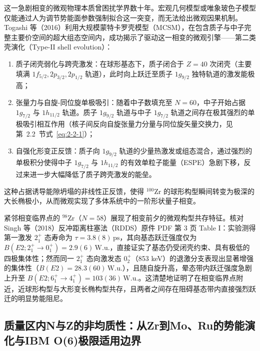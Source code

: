 这一急剧相变的微观物理本质曾困扰学界数十年。宏观几何模型或唯象玻色子模型仅能通过人为调节势能面参数强制拟合这一突变，而无法给出微观因果机制。Togashi 等（2016）\cite{doctoral-r1-g28-togashi-2016-zr-mcsm-qpt}利用大规模蒙特卡罗壳模型（MCSM），在包含质子与中子完整主要价空间的超大组态空间内，成功揭示了驱动这一相变的微观引擎——第二类壳演化（Type-II shell evolution）：
\begin{enumerate}
\item 质子闭壳弱化与跨壳激发：在球形基态下，质子闭合于 $Z=40$ 次闭壳（主要填满 $1f_{5/2}, 2p_{3/2}, 2p_{1/2}$ 轨道），此时向上跃迁至质子 $1g_{9/2}$ 独特轨道的激发能极高；
\item 张量力与自旋-同位旋单极吸引：随着中子数填充至 $N=60$，中子开始占据 $1g_{7/2}$ 与 $1h_{11/2}$ 轨道。质子 $1g_{9/2}$ 轨道与中子 $1g_{7/2}$ 轨道之间存在极其强烈的单极吸引相互作用（核子间反向自旋张量力分量与同位旋矢量交换力，见第~2.2~节式~\eqref{eq:2-2-1}）；
\item 自强化形变正反馈：质子向 $1g_{9/2}$ 轨道的少量热激发或组态混合，通过强烈的单极积分使得中子 $1g_{7/2}$ 与 $1h_{11/2}$ 的有效单粒子能量（ESPE）急剧下移，反过来进一步大幅降低了质子跨壳激发的能垒。
\end{enumerate}
这种占据诱导能隙坍塌的非线性正反馈，使得 $^{100}\mathrm{Zr}$ 的球形构型瞬间转变为极深的大长椭极小，从而微观实现了多体系统中的一阶形状量子相变。

紧邻相变临界点的 $^{98}\mathrm{Zr}$（$N=58$）展现了相变前夕的微观构型共存特征。核对 Singh 等（2018）\cite{doctoral-r1-g28-singh-2018-98zr-lifetimes}反冲距离柱塞法（RDDS）原件 PDF 第 3 页 Table I：实验测得第一激发 $2^+_1$ 态寿命为 $\tau = 3.8(8)\,\mathrm{ps}$，其向基态跃迁强度仅为 $B(E2; 2^+_1 \to 0^+_1) = 2.9(6)\,\mathrm{W.u.}$，直接证实了基态仍受闭壳约束、具有极低的四极集体性；然而同一 $2^+_1$ 态向激发态 $0^+_2$（853 keV）的退激分支表现出显著增强的集体性（$B(E2) = 28.3(60)\,\mathrm{W.u.}$），且随自旋升高，晕态带内跃迁强度急剧上升至 $B(E2; 6^+_1 \to 4^+_1) = 103(36)\,\mathrm{W.u.}$。这清楚地证明了在相变临界点附近，近球形构型与大形变长椭构型共存，且两者之间存在阻碍基态带内直接强烈跃迁的明显势能阻尼。

\subsection{质量区内N与Z的非均质性：从Zr到Mo、Ru的势能演化与IBM O(6)极限适用边界}\label{sec:4-3-2}

